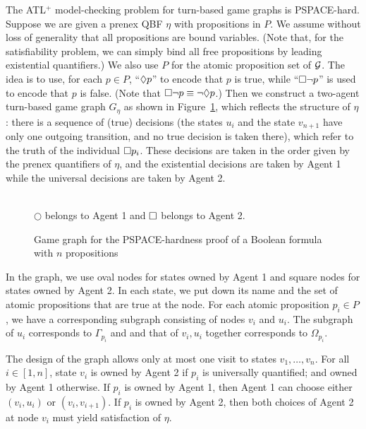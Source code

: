 {\lemma \label{lemma.bsil.mck.nphard}
The ATL$^+$ model-checking problem for turn-based game graphs is PSPACE-hard.
}
\\\pf 
Suppose we are given a prenex QBF $\eta$ with propositions in $P$.
We assume without loss of generality that all propositions are bound variables.
(Note that, for the satisfiability problem, we can simply bind all free propositions by leading existential quantifiers.)
We also use $P$ for the atomic proposition set of ${\cal G}$.  
The idea is to use, for each $p\in P$,  
``$\Diamond p$'' 
to encode that $p$ is true, while 
``$\Box\neg p$'' is used
to encode that $p$ is false.
(Note that $\Box\neg p\equiv \neg\Diamond p$.)   
Then we construct a two-agent turn-based game graph $G_\eta$ as shown
in Figure~\ref{fig.gg.bsil.nphard}, which reflects the structure of $\eta$:
there is a sequence of (true) decisions (the states $u_i$ and the state $v_{n+1}$
have only one outgoing transition, and no true decision is taken there), which refer to the truth of the individual $\Box p_i$.
These decisions are taken in the order given by the prenex quantifiers of $\eta$,
and the existential decisions are taken by Agent 1 while the universal decisions are taken by Agent 2.
\begin{figure}[!ht]
\begin{center}
% 
\\
$\bigcirc$ belongs to Agent 1 and $\Box$ belongs to Agent 2.
\end{center}
\caption{Game graph for the PSPACE-hardness proof of a Boolean formula
with $n$ propositions}
\label{fig.gg.bsil.nphard}
\end{figure}

In the graph, we use oval nodes for states owned by Agent 1 and 
square nodes for states owned by Agent 2.
In each state, we put down its name and the set of atomic
propositions that are true at the node.
For each atomic proposition $p_i\in P$,
we have a corresponding subgraph consisting of nodes
$v_i$ and $u_i$.
The subgraph of $u_i$ corresponds to $\Gamma_{p_i}$ and
and that of $v_i,u_i$ together corresponds to $\Omega_{p_i}$.  

The design of the graph allows only at most one visit
to states $v_1,\ldots,v_n$.
For all $i\in[1,n]$, state $v_i$ is owned by Agent 2 if $p_i$ is
universally quantified;
and owned by Agent 1 otherwise.
If $p_i$ is owned by Agent 1,
then Agent 1 can choose either
$(v_i,u_i)$ or $(v_i,v_{i+1})$.
If $p_i$ is owned by Agent 2,
then both choices of Agent 2 at node $v_i$ must yield
satisfaction of $\eta$.

